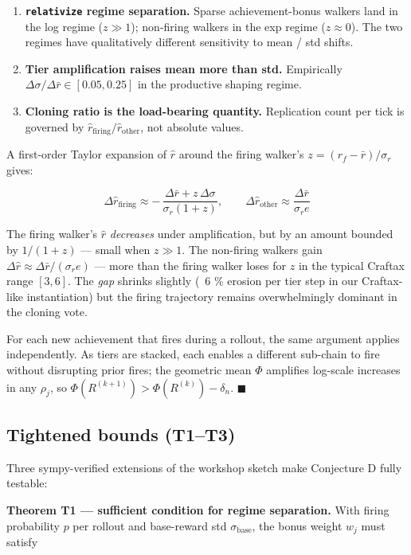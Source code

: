 \documentclass[11pt,letterpaper]{article}
\begin{document}
\begin{enumerate}
\item \textbf{\texttt{relativize} regime separation.} Sparse achievement-bonus walkers land in the log regime ($z \gg 1$); non-firing walkers in the exp regime ($z \approx 0$). The two regimes have qualitatively different sensitivity to mean / std shifts.
\item \textbf{Tier amplification raises mean more than std.} Empirically $\Delta\sigma / \Delta\bar r \in [0.05, 0.25]$ in the productive shaping regime.
\item \textbf{Cloning ratio is the load-bearing quantity.} Replication count per tick is governed by $\widehat{r}_{\text{firing}} / \widehat{r}_{\text{other}}$, not absolute values.
\end{enumerate}
A first-order Taylor expansion of $\widehat{r}$ around the firing
walker's $z = (r_f - \bar r)/\sigma_r$ gives:

\[
\Delta \widehat{r}_{\text{firing}} \approx -\,\frac{\Delta\bar r + z\,\Delta\sigma}{\sigma_r(1+z)}, \qquad
\Delta \widehat{r}_{\text{other}} \approx \frac{\Delta\bar r}{\sigma_r e}
\]

The firing walker's $\widehat{r}$ \emph{decreases} under amplification, but
by an amount bounded by $1/(1+z)$ — small when $z \gg 1$. The
non-firing walkers gain $\Delta\widehat{r} \approx \Delta\bar r / (\sigma_r e)$
— more than the firing walker loses for $z$ in the typical Craftax
range $[3, 6]$. The \emph{gap} shrinks slightly (~6 \% erosion per tier
step in our Craftax-like instantiation) but the firing trajectory
remains overwhelmingly dominant in the cloning vote.

For each new achievement that fires during a rollout, the same
argument applies independently. As tiers are stacked, each enables a
different sub-chain to fire without disrupting prior fires; the
geometric mean $\Phi$ amplifies log-scale increases in any $\rho_j$,
so $\Phi(R^{(k+1)}) > \Phi(R^{(k)}) - \delta_n$. $\blacksquare$

\subsection{Tightened bounds (T1–T3)}

Three sympy-verified extensions of the workshop sketch make
Conjecture D fully testable:

\textbf{Theorem T1 — sufficient condition for regime separation.} With
firing probability $p$ per rollout and base-reward std $\sigma_{\text{base}}$, the bonus weight $w_j$ must satisfy
\end{document}
